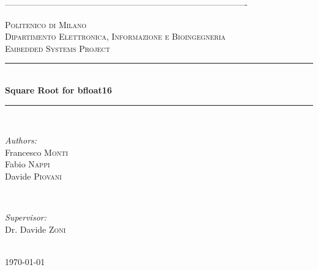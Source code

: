 \documentclass[12pt]{article}
\begin{document}
\begin{titlepage}

\newcommand{\HRule}{\rule{\linewidth}{0.5mm}} 

\center
-------------------------------------------------------------------------------------

\textsc{\LARGE Politenico di Milano}\\[1cm]
\textsc{\Large Dipartimento Elettronica, Informazione e Bioingegneria}\\[0.5cm] 
\textsc{\large Embedded Systems Project}\\[0.5cm] 


\HRule \\[0.4cm]
{ \huge \bfseries Square Root for bfloat16}\\[0.4cm]
\HRule \\[1.5cm]
 

\begin{minipage}{0.4\textwidth}
	\begin{flushleft} \large
		\emph{Authors:}\\
		Francesco \textsc{Monti} \\
		Fabio \textsc{Nappi} \\
		Davide \textsc{Piovani} 
	\end{flushleft}
\end{minipage}
~
\begin{minipage}{0.4\textwidth}
	\begin{flushright} \large
		\emph{Supervisor:} \\
		Dr. Davide \textsc{Zoni}
	\end{flushright}
\end{minipage}\\[1.5cm]



{\large \today}\\[2cm] 


\end{titlepage}
\end{document}
